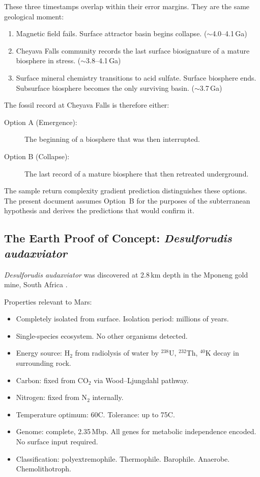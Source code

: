 \documentclass[11pt, a4paper]{article}
\begin{document}
These three timestamps overlap within
their error margins. They are the same
geological moment:

\begin{enumerate}[leftmargin=*, label=(\arabic*)]
\item Magnetic field fails. Surface attractor
  basin begins collapse. ($\sim$4.0--4.1\,Ga)
\item Cheyava Falls community records the
  last surface biosignature of a mature
  biosphere in stress. ($\sim$3.8--4.1\,Ga)
\item Surface mineral chemistry transitions
  to acid sulfate. Surface biosphere ends.
  Subsurface biosphere becomes the only
  surviving basin. ($\sim$3.7\,Ga)
\end{enumerate}

The fossil record at Cheyava Falls
\cite{hurowitz2025} is therefore either:

\begin{description}
\item[Option A (Emergence):] The beginning
  of a biosphere that was then interrupted.
\item[Option B (Collapse):] The last record
  of a mature biosphere that then retreated
  underground. \cite{collapse_emergence}
\end{description}

The sample return complexity gradient
prediction \cite{collapse_emergence}
distinguishes these options.
The present document assumes Option~B
for the purposes of the subterranean
hypothesis and derives the predictions
that would confirm it.

\subsection{The Earth Proof of Concept:
\textit{Desulforudis audaxviator}}

\textit{Desulforudis audaxviator} was
discovered at 2.8\,km depth in the Mponeng
gold mine, South Africa \cite{chivian2008}.

Properties relevant to Mars:

\begin{itemize}[leftmargin=*]
\item Completely isolated from surface.
  Isolation period: millions of years.
\item Single-species ecosystem.
  No other organisms detected.
\item Energy source: H$_2$ from radiolysis
  of water by $^{238}$U, $^{232}$Th,
  $^{40}$K decay in surrounding rock.
\item Carbon: fixed from CO$_2$ via
  Wood--Ljungdahl pathway.
\item Nitrogen: fixed from N$_2$ internally.
\item Temperature optimum: 60\textdegree{}C.
  Tolerance: up to 75\textdegree{}C.
\item Genome: complete, 2.35\,Mbp.
  All genes for metabolic independence
  encoded. No surface input required.
\item Classification: polyextremophile.
  Thermophile. Barophile. Anaerobe.
  Chemolithotroph.
\end{itemize}
\end{document}
